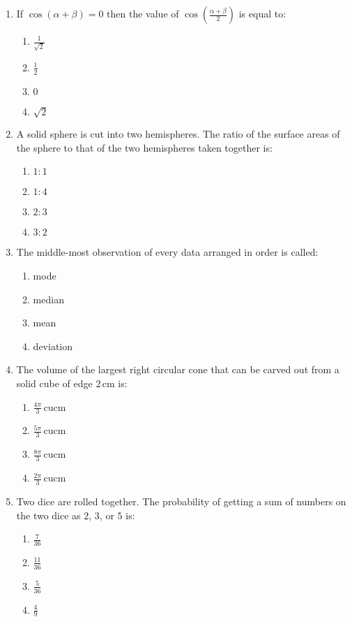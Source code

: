 \documentclass[12pt,-letter paper]{article}
\begin{document}
\begin{enumerate}
\item If $\cos(\alpha + \beta) = 0$ then the value of $\cos\left(\frac{\alpha + \beta}{2}\right)$ is equal to:
    \begin{enumerate}
    \item $\frac{1}{\sqrt{2}}$
    \item $\frac{1}{2}$
    \item $0$
    \item $\sqrt{2}$
    \end{enumerate}
\newpage
\item A solid sphere is cut into two hemispheres. The ratio of the surface areas of the sphere to that of the two hemispheres taken together is:
	\begin{enumerate}    
\item $1:1$
    \item $1:4$
    \item $2:3$
    \item $3:2$
	\end{enumerate}
\item The middle-most observation of every data arranged in order is called:
	\begin{enumerate}    
\item mode
    \item median
    \item mean
    \item deviation
\end{enumerate}
\item The volume of the largest right circular cone that can be carved out from a solid cube of edge $2 \, \text{cm}$ is:
	\begin{enumerate}    
\item $\frac{4\pi}{3} \, \mathrm{cu cm}$
    \item $\frac{5\pi}{3} \, \mathrm{cu cm}$
    \item $\frac{8\pi}{3} \, \mathrm{cu cm}$
    \item $\frac{2\pi}{3} \, \mathrm{cu cm}$
	\end{enumerate}
\item Two dice are rolled together. The probability of getting a sum of numbers on the two dice as $2$, $3$, or $5$ is:
	\begin{enumerate}    
\item $\frac{7}{36}$
    \item $\frac{11}{36}$
    \item $\frac{5}{36}$
    \item $\frac{4}{9}$

\end{enumerate}
\end{enumerate}
\end{document}
